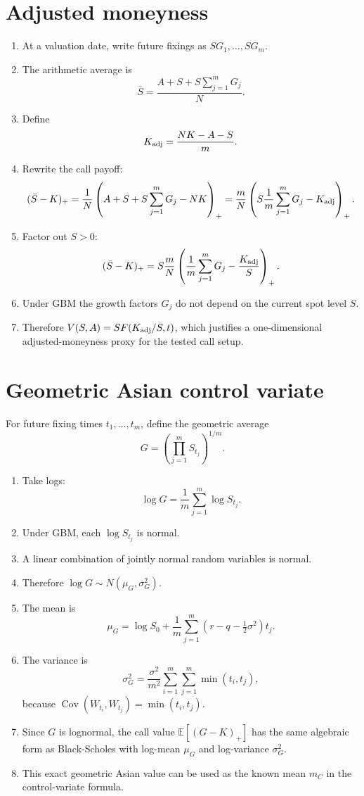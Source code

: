\documentclass[11pt,oneside]{book}
\theoremstyle{definition}
\newenvironment{proofsteps}
{\begin{enumerate}[label=\textbf{Line \arabic*.}, itemsep=0.35em]}
{\end{enumerate}}
\newcommand{\E}{\mathbb{E}}
\newcommand{\Cov}{\operatorname{Cov}}
\begin{document}
\section{Adjusted moneyness}
\begin{proofsteps}
\item At a valuation date, write future fixings as \(S G_1,\ldots,S G_m\).
\item The arithmetic average is
\[
\bar S=\frac{A+S+S\sum_{j=1}^mG_j}{N}.
\]
\item Define
\[
K_{\rm adj}=\frac{NK-A-S}{m}.
\]
\item Rewrite the call payoff:
\[
(\bar S-K)_+
=\frac1N\left(A+S+S\sum_{j=1}^mG_j-NK\right)_+
=\frac{m}{N}\left(S\frac1m\sum_{j=1}^mG_j-K_{\rm adj}\right)_+.
\]
\item Factor out \(S>0\):
\[
(\bar S-K)_+
=S\frac{m}{N}\left(\frac1m\sum_{j=1}^mG_j-\frac{K_{\rm adj}}{S}\right)_+.
\]
\item Under GBM the growth factors \(G_j\) do not depend on the current spot level \(S\).
\item Therefore \(V(S,A)=S F(K_{\rm adj}/S,t)\), which justifies a one-dimensional adjusted-moneyness proxy for the tested call setup.
\end{proofsteps}

\section{Geometric Asian control variate}
For future fixing times \(t_1,\ldots,t_m\), define the geometric average
\[
  G=\left(\prod_{j=1}^m S_{t_j}\right)^{1/m}.
\]
\begin{proofsteps}
\item Take logs:
\[
  \log G=\frac1m\sum_{j=1}^m \log S_{t_j}.
\]
\item Under GBM, each \(\log S_{t_j}\) is normal.
\item A linear combination of jointly normal random variables is normal.
\item Therefore \(\log G\sim N(\mu_G,\sigma_G^2)\).
\item The mean is
\[
  \mu_G
  =
  \log S_0
  +
  \frac1m\sum_{j=1}^m(r-q-\tfrac12\sigma^2)t_j.
\]
\item The variance is
\[
  \sigma_G^2
  =
  \frac{\sigma^2}{m^2}
  \sum_{i=1}^m\sum_{j=1}^m \min(t_i,t_j),
\]
because \(\Cov(W_{t_i},W_{t_j})=\min(t_i,t_j)\).
\item Since \(G\) is lognormal, the call value \(\E[(G-K)_+]\) has the same algebraic form as Black-Scholes with log-mean \(\mu_G\) and log-variance \(\sigma_G^2\).
\item This exact geometric Asian value can be used as the known mean \(m_C\) in the control-variate formula.
\end{proofsteps}
\end{document}
